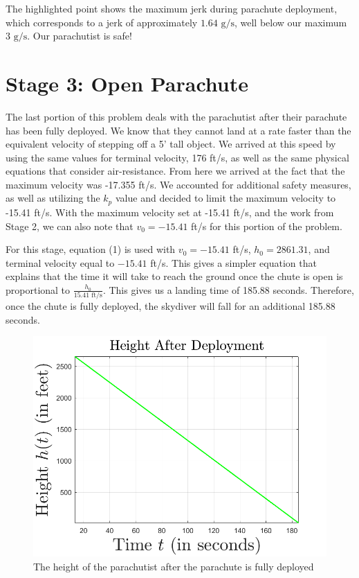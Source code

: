 \documentclass{article}
\begin{document}
    The highlighted point shows the maximum jerk during parachute deployment, which corresponds to a jerk of approximately $1.64 \text{ g/s}$, well below our maximum $3 \text{ g/s}$. Our parachutist is safe!

    \section*{Stage 3: Open Parachute}

    The last portion of this problem deals with the parachutist after their parachute has been fully deployed. We know that they cannot land at a rate faster than the equivalent velocity of stepping off a 5' tall object. We arrived at this speed by using the same values for terminal velocity, 176 ft/s, as well as the same physical equations that consider air-resistance. From here we arrived at the fact that the maximum velocity was -17.355 ft/s. We accounted for additional safety measures, as well as utilizing the $k_p$ value and decided to limit the maximum velocity to -15.41 ft/s. With the maximum velocity set at -15.41 ft/s, and the work from Stage 2, we can also note that $v_0 = -15.41$ ft/s for this portion of the problem.
    \newline
    
    For this stage, equation (1) is used with $v_0 = -15.41$ ft/s, $h_0 = 2861.31$, and terminal velocity equal to $-15.41$ ft/s. This gives a simpler equation that explains that the time it will take to reach the ground once the chute is open is proportional to $\frac{h_0}{15.41 \text{ ft/s}}$. This gives us a landing time of 185.88 seconds. Therefore, once the chute is fully deployed, the skydiver will fall for an additional 185.88 seconds.

    \begin{figure}[H]
        \centering
        \includegraphics[scale = 0.45]{heightAfterDeployment}
        \caption{The height of the parachutist after the parachute is fully deployed}
    \end{figure}
\end{document}
